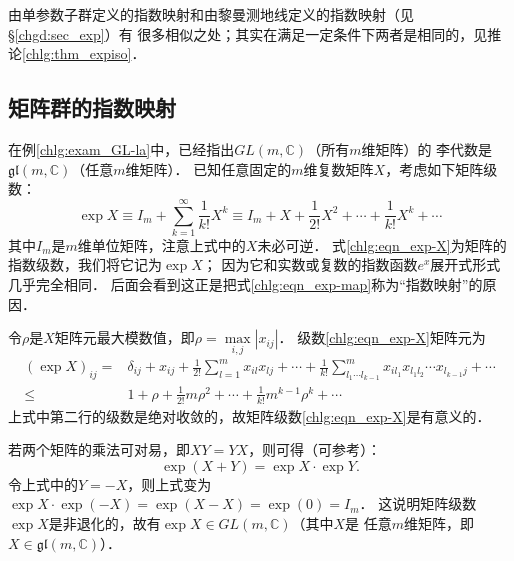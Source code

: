 由单参数子群定义的指数映射和由黎曼测地线定义的指数映射（见\S\ref{chgd:sec_exp}）有
很多相似之处；其实在满足一定条件下两者是相同的，见推论\ref{chlg:thm_expiso}．



\subsection{矩阵群的指数映射}\label{chlg:sec_GL-exp}

在例\ref{chlg:exam_GL-la}中，已经指出$GL(m,\mathbb{C})$（所有$m$维矩阵）的
李代数是$\mathfrak{gl}(m,\mathbb{C})$（任意$m$维矩阵）．
已知任意固定的$m$维复数矩阵$X$，考虑如下矩阵级数：
\begin{equation}\label{chlg:eqn_exp-X}
    \exp X \equiv I_m+\sum_{k=1}^{\infty} \frac{1}{k!}X^k \equiv 
    I_m + X + \frac{1}{2!} X^2 + \cdots +\frac{1}{k!} X^k + \cdots 
\end{equation}
其中$I_m$是$m$维单位矩阵，注意上式中的$X$未必可逆．
式\eqref{chlg:eqn_exp-X}为矩阵的指数级数，我们将它记为$\exp X$；
因为它和实数或复数的指数函数$e^x$展开式形式几乎完全相同．
后面会看到这正是把式\eqref{chlg:eqn_exp-map}称为“{\heiti 指数映射}”的原因．


令$\rho$是$X$矩阵元最大模数值，即$\rho= \max\limits_{i,j} |x_{ij}|$．
级数\eqref{chlg:eqn_exp-X}矩阵元为
\begin{align*}
    (\exp X )_{ij} =& \delta_{ij} + x_{ij} + \frac{1}{2!} \sum_{l=1}^{m} x_{il} x_{lj}
     + \cdots + \frac{1}{k!} \sum_{l_1\cdots l_{k-1}}^{m} x_{il_1} x_{l_1 l_2} \cdots x_{l_{k-1} j}
     + \cdots \\
    \leqslant & 1 +\rho +  \frac{1}{2!} m \rho ^2+\cdots + \frac{1}{k!} m^{k-1} \rho^k + \cdots
\end{align*}
上式中第二行的级数是绝对收敛的，故矩阵级数\eqref{chlg:eqn_exp-X}是有意义的．


若两个矩阵的乘法可对易，即$XY=YX$，则可得（可参考\parencite[3.35(9)]{warner-1983-FDMLG}）：
\begin{equation}\label{chlg:eqn_tmp34}
    \exp(X+Y) = \exp X \cdot \exp Y . 
\end{equation}
令上式中的$Y=-X$，则上式变为$\exp X \cdot \exp (-X) = \exp(X-X) = \exp (0) = I_m$．
这说明矩阵级数$\exp X$是非退化的，故有$\exp X \in GL(m,\mathbb{C})$（其中$X$是
任意$m$维矩阵，即$X \in \mathfrak{gl}(m,\mathbb{C})$）．

